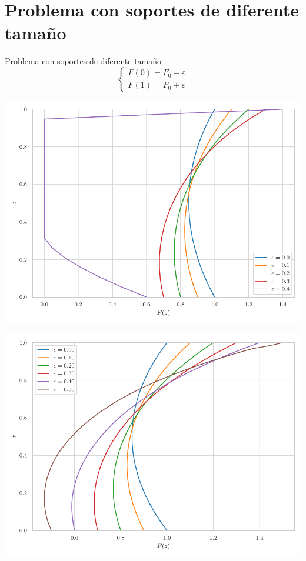 \documentclass[11pt]{beamer}
\begin{document}
	\section{Problema con soportes de diferente tamaño}
		\begin{frame}{Problema con soportes de diferente tamaño}
			\centering
                \begin{equation*}
                    \begin{cases}
                        F(0) = F_0 - \varepsilon \\
                        F(1) = F_0 + \varepsilon
                    \end{cases}
                \end{equation*}
                
                \begin{minipage}[b]{0.48\textwidth}
                    \centering
                    \includegraphics[height=0.5 \textheight]{Figuras/sol_var_epsn20.pdf}
                \end{minipage}
                \hfill
                \begin{minipage}[b]{0.48\textwidth}
                    \centering
                    \includegraphics[height=0.5 \textheight]{Figuras/sol_var_epsn100.pdf}
                \end{minipage}
		\end{frame}
\end{document}
